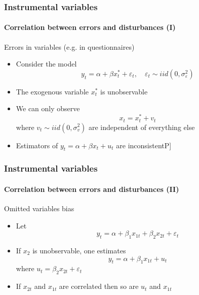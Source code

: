 \documentclass[notes=show]{beamer}
\begin{document}
\begin{frame}\frametitle{Instrumental variables}\framesubtitle{Correlation between errors and disturbances (I)}
Errors in variables (e.g. in questionnaires)
\begin{itemize}
    \item Consider the model
    \begin{equation*}
        y_{t}=\alpha +\beta x_{t}^{\ast }+\varepsilon _{t},\quad \varepsilon_{t}\sim iid(0,\sigma _{\varepsilon }^{2})
    \end{equation*}
    \item The exogenous variable $x_{t}^{\ast }$ is unobservable
    \item We can only observe
    \begin{equation*}
        x_{t}=x_{t}^{\ast }+v_{t}
    \end{equation*}%
    where $v_{t}\sim iid(0,\sigma _{v}^{2})$ are independent of everything else
    \item Estimators of $y_{t}=\alpha +\beta x_{t}+u_{t}$ are inconsistent\hfill\lbrack P]
\end{itemize}
\end{frame}


\begin{frame}\frametitle{Instrumental variables}\framesubtitle{Correlation between errors and disturbances (II)}
Omitted variables bias
\begin{itemize}
    \item Let
    \begin{equation*}
        y_{t}=\alpha +\beta _{1}x_{1t}+\beta _{2}x_{2t}+\varepsilon _{t}
    \end{equation*}
    \item If $x_{2}$ is unobservable, one estimates
    \begin{equation*}
        y_{t}=\alpha +\beta _{1}x_{1t}+u_{t}
    \end{equation*}
    where $u_{t}=\beta _{2}x_{2t}+\varepsilon _{t}$
    \item If $x_{2t}$ and $x_{1t}$ are correlated then so are $u_{t}$ and $x_{1t} $
\end{itemize}
\end{frame}
\end{document}
